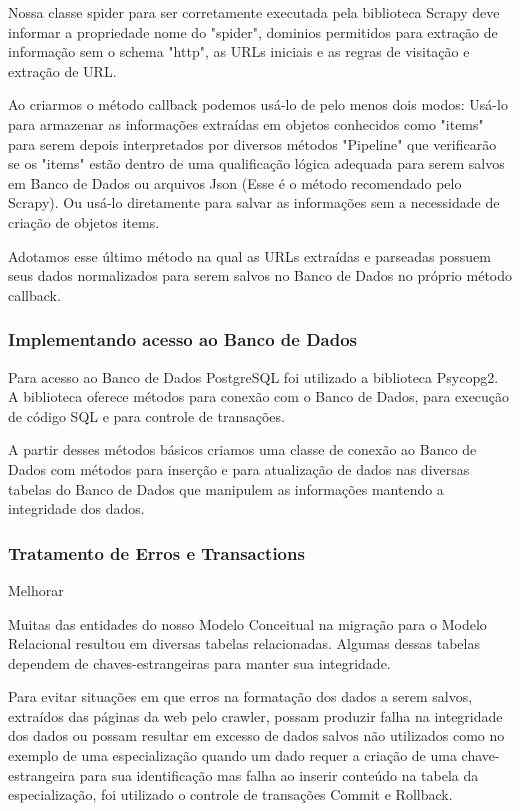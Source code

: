 \documentclass[12pt]{article}
\begin{document}
Nossa classe spider para ser corretamente executada pela biblioteca Scrapy deve informar a propriedade nome do "spider", dominios permitidos para extração de informação sem o schema "http", as URLs iniciais e as regras de visitação e extração de URL.

Ao criarmos o método callback podemos usá-lo de pelo menos dois modos: Usá-lo para armazenar as informações extraídas em objetos conhecidos como "items" para serem depois interpretados por diversos métodos "Pipeline" que verificarão se os "items" estão dentro de uma qualificação lógica adequada para serem salvos em Banco de Dados ou arquivos Json (Esse é o método recomendado pelo Scrapy). Ou usá-lo diretamente para salvar as informações sem a necessidade de criação de objetos items.

Adotamos esse último método na qual as URLs extraídas e parseadas possuem seus dados normalizados para serem salvos no Banco de Dados no próprio método callback.
 
 
\subsubsection{Implementando acesso ao Banco de Dados}

Para acesso ao Banco de Dados PostgreSQL foi utilizado a biblioteca Psycopg2. A biblioteca oferece métodos para conexão com o Banco de Dados, para execução de código SQL e para controle de transações.

A partir desses métodos básicos criamos uma classe de conexão ao Banco de Dados com métodos para inserção e para atualização de dados nas diversas tabelas do Banco de Dados que manipulem as informações mantendo a integridade dos dados.

\subsubsection{Tratamento de Erros e Transactions}{Melhorar}

Muitas das entidades do nosso Modelo Conceitual na migração para o Modelo Relacional resultou em diversas tabelas relacionadas. Algumas dessas tabelas dependem de chaves-estrangeiras para manter sua integridade.  

Para evitar situações em que erros na formatação dos dados a serem salvos, extraídos das páginas da web pelo crawler, possam produzir falha na integridade dos dados ou possam resultar em excesso de dados salvos não utilizados como no exemplo de uma especialização quando um dado requer a criação de uma chave-estrangeira para sua identificação mas falha ao inserir conteúdo na tabela da especialização, foi utilizado o controle de transações Commit e Rollback.
\end{document}
